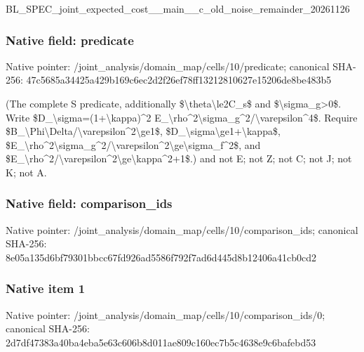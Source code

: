 \documentclass[10pt,a4paper]{article}
\begin{document}
BL\_SPEC\_joint\_expected\_c\allowbreak{}ost\_\_main\_\_c\_old\_noise\_r\allowbreak{}emainder\_20261126


\subsubsection{Native field: predicate}


Native pointer: /joint\_analysis/domain\_m\allowbreak{}ap/cells/10/predicate; canonical SHA-256: 47c5685a34425a429b169c6e\allowbreak{}c2d2f26ef78ff13212810627\allowbreak{}e15206de8be483b5


(The complete S predicate, additionally \$\textbackslash{}theta\textbackslash{}le2C\_s\$ and \$\textbackslash{}sigma\_g>0\$. Write \$D\_\textbackslash{}sigma=(1+\textbackslash{}kappa)\textasciicircum{}2 E\_\textbackslash{}rho\textasciicircum{}2\textbackslash{}sigma\_g\textasciicircum{}2/\textbackslash{}varepsilon\textasciicircum{}4\$. Require \$B\_\textbackslash{}Phi\textbackslash{}Delta/\textbackslash{}varepsilon\textasciicircum{}2\textbackslash{}ge1\$, \$D\_\textbackslash{}sigma\textbackslash{}ge1+\textbackslash{}kappa\$, \$E\_\textbackslash{}rho\textasciicircum{}2\textbackslash{}sigma\_g\textasciicircum{}2/\textbackslash{}var\allowbreak{}epsilon\textasciicircum{}2\textbackslash{}ge\textbackslash{}sigma\_f\textasciicircum{}2\$, and \$E\_\textbackslash{}rho\textasciicircum{}2/\textbackslash{}varepsilon\textasciicircum{}2\textbackslash{}ge\textbackslash{}kappa\textasciicircum{}2+1\$.) and not E; not Z; not C; not J; not K; not A.


\subsubsection{Native field: comparison\_ids}


Native pointer: /joint\_analysis/domain\_m\allowbreak{}ap/cells/10/comparison\_i\allowbreak{}ds; canonical SHA-256: 8e05a135d6bf79301bbcc67f\allowbreak{}d926ad5586f792f7ad6d445d\allowbreak{}8b12406a41cb0cd2



\subsubsection{Native item 1}


Native pointer: /joint\_analysis/domain\_m\allowbreak{}ap/cells/10/comparison\_i\allowbreak{}ds/0; canonical SHA-256: 2d7df47383a40ba4eba5e63c\allowbreak{}606b8d011ae809c160ec7b5c\allowbreak{}4638e9c6bafebd53
\end{document}
